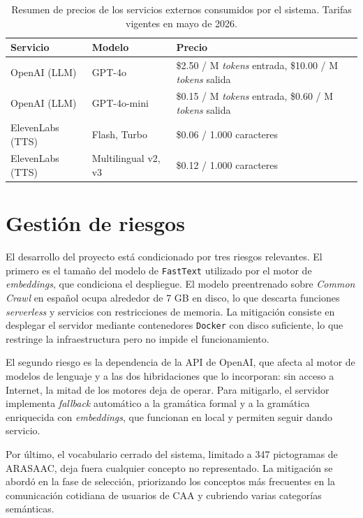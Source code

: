 \begin{table}[H]
\centering
\small
\begin{tabular}{l l l}
\hline
Servicio & Modelo & Precio \\
\hline
OpenAI (LLM) & GPT-4o & \$2.50 / M \textit{tokens} entrada, \$10.00 / M \textit{tokens} salida \\
OpenAI (LLM) & GPT-4o-mini & \$0.15 / M \textit{tokens} entrada, \$0.60 / M \textit{tokens} salida \\
ElevenLabs (TTS) & Flash, Turbo & \$0.06 / 1.000 caracteres \\
ElevenLabs (TTS) & Multilingual v2, v3 & \$0.12 / 1.000 caracteres \\
\hline
\end{tabular}
\vspace{0.3em}
\caption{Resumen de precios de los servicios externos consumidos por el sistema. Tarifas vigentes en mayo de 2026.}
\label{tab:costes-servicios}
\end{table}

\section{Gestión de riesgos}
\label{sec:riesgos}

El desarrollo del proyecto está condicionado por tres riesgos relevantes. El primero es el tamaño del modelo de \texttt{FastText} utilizado por el motor de \textit{embeddings}, que condiciona el despliegue. El modelo preentrenado sobre \textit{Common Crawl} en español ocupa alrededor de 7 GB en disco, lo que descarta funciones \textit{serverless} y servicios con restricciones de memoria. La mitigación consiste en desplegar el servidor mediante contenedores \texttt{Docker} con disco suficiente, lo que restringe la infraestructura pero no impide el funcionamiento.

El segundo riesgo es la dependencia de la API de OpenAI, que afecta al motor de modelos de lenguaje y a las dos hibridaciones que lo incorporan: sin acceso a Internet, la mitad de los motores deja de operar. Para mitigarlo, el servidor implementa \textit{fallback} automático a la gramática formal y a la gramática enriquecida con \textit{embeddings}, que funcionan en local y permiten seguir dando servicio.

Por último, el vocabulario cerrado del sistema, limitado a 347 pictogramas de ARASAAC, deja fuera cualquier concepto no representado. La mitigación se abordó en la fase de selección, priorizando los conceptos más frecuentes en la comunicación cotidiana de usuarios de CAA y cubriendo varias categorías semánticas.

